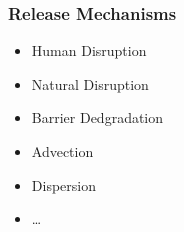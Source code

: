 
\begin{frame}[ctb!]
  \frametitle{Release Mechanisms}
  \begin{itemize} 
  \item Human Disruption
  \item Natural Disruption
  \item Barrier Dedgradation
  \item Advection
  \item Dispersion
  \item \ldots
  \end{itemize}
\end{frame}
